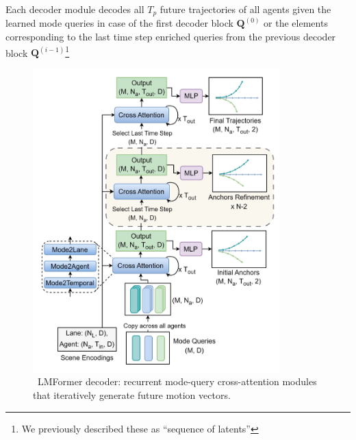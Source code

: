 Each decoder module decodes all \( T_p \) future trajectories of all agents given the learned mode queries in case of the first decoder block \( \mathbf{Q}^{(0)} \) or the elements corresponding to the last time step enriched queries from the previous decoder block \( \mathbf{Q}^{(i-1)} \)\footnote{We previously described these as ``sequence of latents''}

\begin{figure}[ht]
  \centering
  \includegraphics[width=0.85\textwidth]{figures/lmformer_arch_decoder.png}
  \caption{\cite{lmformerYadav2025}~LMFormer decoder: recurrent mode-query cross-attention modules that iteratively generate future motion vectors.}
  \label{fig:lmformer_arch_decoder}
\end{figure}

